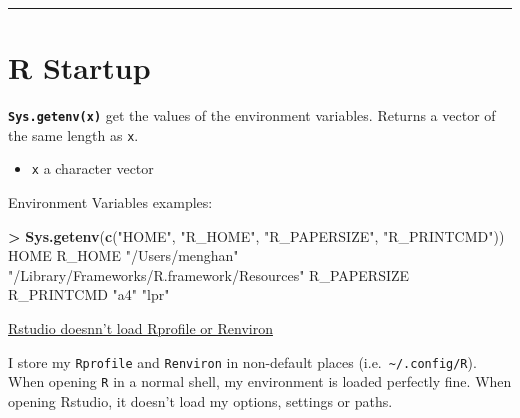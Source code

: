 \documentclass[
  a4paper,
  twoside,
  openright]{book}
\newenvironment{Shaded}{\begin{snugshade}}{\end{snugshade}}
\newcommand{\FunctionTok}[1]{\textcolor[rgb]{0.13,0.29,0.53}{\textbf{#1}}}
\newcommand{\NormalTok}[1]{#1}
\newcommand{\SpecialCharTok}[1]{\textcolor[rgb]{0.81,0.36,0.00}{\textbf{#1}}}
\newcommand{\StringTok}[1]{\textcolor[rgb]{0.31,0.60,0.02}{#1}}
\providecommand{\tightlist}{%
  \setlength{\itemsep}{0pt}\setlength{\parskip}{0pt}}
\theoremstyle{definition}
\theoremstyle{definition}
\theoremstyle{definition}
\theoremstyle{definition}
\theoremstyle{remark}
\begin{document}
\begin{center}\rule{0.5\linewidth}{0.5pt}\end{center}

\section{R Startup}\label{r-startup}

\textbf{\texttt{Sys.getenv(x)}} get the values of the environment variables. Returns a vector of the same length as \texttt{x}.

\begin{itemize}
\tightlist
\item
  \texttt{x} a character vector
\end{itemize}

Environment Variables examples:

\begin{Shaded}
\begin{Highlighting}[]
\SpecialCharTok{\textgreater{}} \FunctionTok{Sys.getenv}\NormalTok{(}\FunctionTok{c}\NormalTok{(}\StringTok{"HOME"}\NormalTok{, }\StringTok{"R\_HOME"}\NormalTok{, }\StringTok{"R\_PAPERSIZE"}\NormalTok{, }\StringTok{"R\_PRINTCMD"}\NormalTok{))}
\NormalTok{           HOME                                      R\_HOME }
\StringTok{"/Users/menghan"} \StringTok{"/Library/Frameworks/R.framework/Resources"} 
\NormalTok{    R\_PAPERSIZE                                  R\_PRINTCMD }
           \StringTok{"a4"}                                       \StringTok{"lpr"} 
\end{Highlighting}
\end{Shaded}

\href{https://community.rstudio.com/t/rstudio-doesnnt-load-rprofile-or-renviron/57721}{Rstudio doesnn't load Rprofile or Renviron}

I store my \texttt{Rprofile} and \texttt{Renviron} in non-default places (i.e.~\texttt{\textasciitilde{}/.config/R}). When opening \texttt{R} in a normal shell, my environment is loaded perfectly fine. When opening Rstudio, it doesn't load my options, settings or paths.
\end{document}
